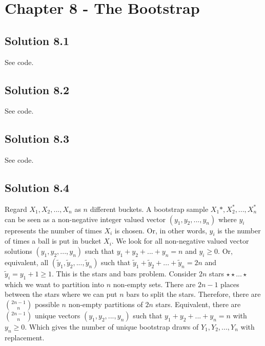 \section*{Chapter 8 - The Bootstrap}

\subsection*{Solution 8.1}

See code.


\subsection*{Solution 8.2}

See code.


\subsection*{Solution 8.3}

See code.


\subsection*{Solution 8.4}

Regard $X_1, X_2, ..., X_n$ as $n$ different buckets.
A bootstrap sample $X_1*, X_2^*, ..., X_n^*$ can be seen as a non-negative integer valued vector $(y_1, y_2, ..., y_n)$ where $y_i$ represents the number of times $X_i$ is chosen.
Or, in other words, $y_i$ is the number of times a ball is put in bucket $X_i$.
We look for all non-negative valued vector solutions $(y_1, y_2, ..., y_n)$ such that $y_1 + y_2 + ... + y_n = n$ and $y_i \geq 0$.
Or, equivalent, all $(\tilde{y}_1, \tilde{y}_2, ..., \tilde{y}_n)$ such that $\tilde{y}_1 + \tilde{y}_2 + ... + \tilde{y}_n = 2n$ and $\tilde{y}_i = y_1 + 1 \geq 1$.
This is the stars and bars problem.
Consider $2n$ stars $\star \star \ldots \star$ which we want to partition into $n$ non-empty sets.
There are $2n - 1$ places between the stars where we can put $n$ bars to split the stars.
Therefore, there are $\binom{2n - 1}{n}$ possible $n$ non-empty partitions of $2n$ stars.
Equivalent, there are $\binom{2n - 1}{n}$ unique vectors $(y_1, y_2, ..., y_n)$ such that $y_1 + y_2 + ... + y_n = n$ with $y_n \geq 0$.
Which gives the number of unique bootstrap draws of $Y_1, Y_2, ..., Y_n$ with replacement.
